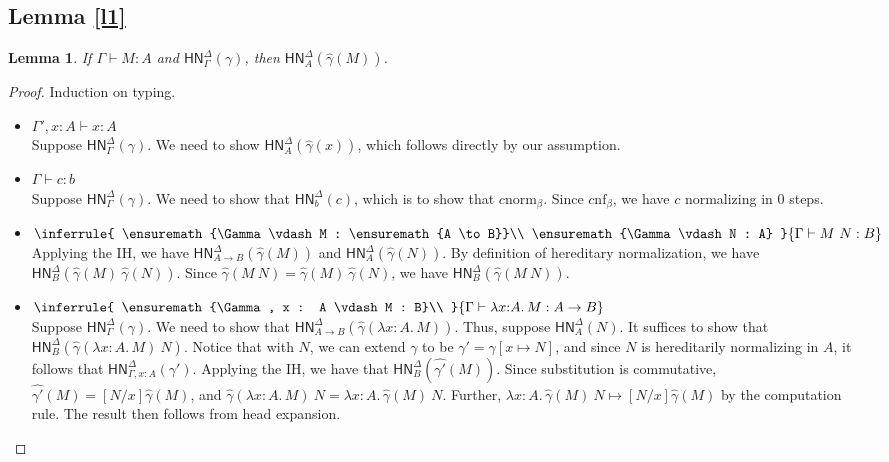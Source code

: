 \documentclass{article}
\newtheorem*{lemm}{Lemma}
\newcommand{\hasEF}[3]{\ensuremath{#1 \vdash #2 : #3}}
\newcommand{\bnf}[1]{#1 \mathrel{\text{nf}_\beta}}
\newcommand{\bnorm}[1]{\ensuremath{#1 \mathrel{\text{norm}_\beta}}}
\newcommand{\hnorm}[3]{\ensuremath{\mathsf{HN}^{#1}_{#2}(#3)}}
\newcommand{\step}[2]{\ensuremath{#1 \mapsto #2}}
\newcommand{\fn}[2]{\ensuremath{#1 \to #2}}
\newcommand{\ap}[2]{\ensuremath{#1\ #2}}
\newcommand{\lam}[3]{\ensuremath{\lambda #1 {:} #2.\, #3}}
\begin{document}
\subsection{Lemma \ref{l1}}

\begin{lemm}
If $\hasEF{\Gamma}{M}{A}$ and $\hnorm{\Delta}{\Gamma}{\gamma}$, then $\hnorm{\Delta}{A}{\hat\gamma(M)}$.
\end{lemm}

\begin{proof}
Induction on typing. 
\begin{itemize}
  \setlength\itemsep{1em}
  \item $\hasEF{\Gamma', x : A}{x}{A}$\\
    Suppose $\hnorm{\Delta}{\Gamma}{\gamma}$. 
    We need to  show $\hnorm{\Delta}{A}{\hat{\gamma}(x)}$, which follows directly by our assumption.
  \item $\hasEF{\Gamma}{c}{b}$\\
    Suppose $\hnorm{\Delta}{\Gamma}{\gamma}$. We need to show that $\hnorm{\Delta}{b}{c}$, which is to 
    show that $\bnorm{c}$. Since $\bnf{c}$, we have $c$ normalizing in 0 steps. 
  \item $\inferrule{
      \hasEF{\Gamma}{M}{\fn{A}{B}}\\
      \hasEF{\Gamma}{N}{A}
    }{\hasEF{\Gamma}{\ap{M}{N}}{B}}$\\
    Applying the IH, we have $\hnorm{\Delta}{\fn{A}{B}}{\hat{\gamma}(M)}$
    and $\hnorm{\Delta}{A}{\hat{\gamma}(N)}$. By definition of hereditary normalization, we have
    $\hnorm{\Delta}{B}{\ap{\hat{\gamma}(M)}{\hat{\gamma}(N)}}$. Since $\hat{\gamma}(\ap{M}{N}) = 
    \ap{\hat{\gamma}(M)}{\hat{\gamma}(N)}$, we have
    $\hnorm{\Delta}{B}{\hat{\gamma}(\ap{M}{N})}$.
  \item
    $\inferrule{
      \hasEF{\Gamma, x : A}{M}{B}\\
    }{\hasEF{\Gamma}{\lam{x}{A}{M}}{\fn{A}{B}}}$\\
    Suppose $\hnorm{\Delta}{\Gamma}{\gamma}$. We need to show that 
    $\hnorm{\Delta}{\fn{A}{B}}{\hat{\gamma}(\lam{x}{A}{M})}$. 
    Thus, suppose $\hnorm{\Delta}{A}{N}$. It suffices to show that 
    $\hnorm{\Delta}{B}{\ap{\hat{\gamma}(\lam{x}{A}{M})}{N}}$. Notice that with $N$, we can extend $\gamma$ to be
    $\gamma' = \gamma[x \mapsto N]$, and since $N$ is hereditarily normalizing in $A$, it follows that 
    $\hnorm{\Delta}{\Gamma,x : A}{\gamma'}$. Applying the IH, we have that $\hnorm{\Delta}{B}{\hat{\gamma'}(M)}$. 
    Since substitution is commutative, $\hat{\gamma'}(M) = [N/x]\hat{\gamma}(M)$, and 
    $\ap{\hat{\gamma}(\lam{x}{A}{M})}{N} = \ap{\lam{x}{A}{\hat{\gamma}(M)}}{N}$. Further, 
    $\step{\ap{\lam{x}{A}{\hat{\gamma}(M)}}{N}}{[N/x]\hat{\gamma}(M)}$ by the computation rule. The result then follows
    from head expansion. 
   \qedhere
\end{itemize}
\end{proof}
\end{document}
